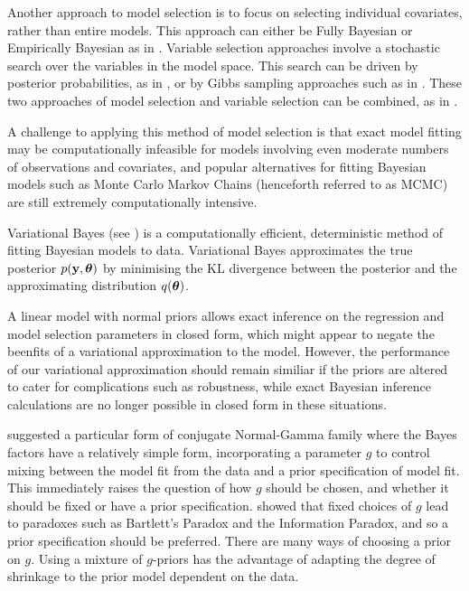 Another approach to model selection is to focus on selecting individual covariates, rather than entire
models. This approach can either be Fully Bayesian or Empirically Bayesian as in \citep{Cui2008}. Variable
selection approaches involve a stochastic search over the variables in the model space. This search can be
driven by posterior probabilities, as in \citep{Casella2006}, or by Gibbs sampling approaches such as in
\citep{George1993}. These two approaches of model selection and variable selection can be combined, as in
\citep{Geweke1996}.

A challenge to applying this method of model selection is that exact model fitting may be computationally
infeasible for models involving even moderate numbers of observations and covariates, and popular alternatives
for fitting Bayesian models such as Monte Carlo Markov Chains (henceforth referred to as MCMC) are still
extremely computationally intensive.

Variational Bayes (see \cite{Ormerod2010}) is a computationally
efficient, deterministic method of fitting Bayesian models to data. Variational Bayes approximates the true
posterior $p({\bf y}, {\boldsymbol \theta})$ by minimising the KL divergence between the posterior and the  approximating
distribution $q({\boldsymbol \theta})$.

A linear model with normal priors allows exact inference on the regression and model selection parameters in
closed form, which might appear to negate the beenfits of a variational approximation to the model. However,
the performance of our variational approximation should remain similiar if the priors are altered to cater for
complications such as robustness, while exact Bayesian inference calculations are no longer possible in closed
form in these situations.

\cite{Zellner1986} suggested a particular form of conjugate Normal-Gamma family where the Bayes factors have a
relatively simple form, incorporating a parameter $g$ to control mixing between the model fit from the data
and a prior specification of model fit. This immediately raises the question of how $g$ should be chosen, and
whether it should be fixed or have a prior specification. \cite{Liang2008} showed that fixed choices of $g$
lead to paradoxes such as Bartlett's Paradox and the Information Paradox, and so a prior specification should
be preferred. There are many ways of choosing a prior on $g$. Using a mixture of $g$-priors has the advantage
of adapting the degree of shrinkage to the prior model dependent on the data.

